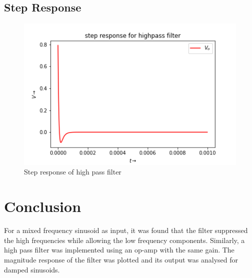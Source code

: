 \documentclass[11pt, a4paper]{article}
\begin{document}
   \subsection{Step Response}
   \begin{figure}[!tbh]
   	\centering
   	\includegraphics[scale=0.65]{step_resph.png}  %
   	\caption{Step response of high pass filter}
   	\label{fig:sample}
   \end{figure}
   \newpage
 \section{Conclusion}
 For a mixed frequency sinusoid as
input, it was found that the filter suppressed the high frequencies while
allowing the low frequency components. Similarly, a high pass filter was
implemented using an op-amp with the same gain. The magnitude response
of the filter was plotted and its output was analysed for damped sinusoids.
\end{document}
